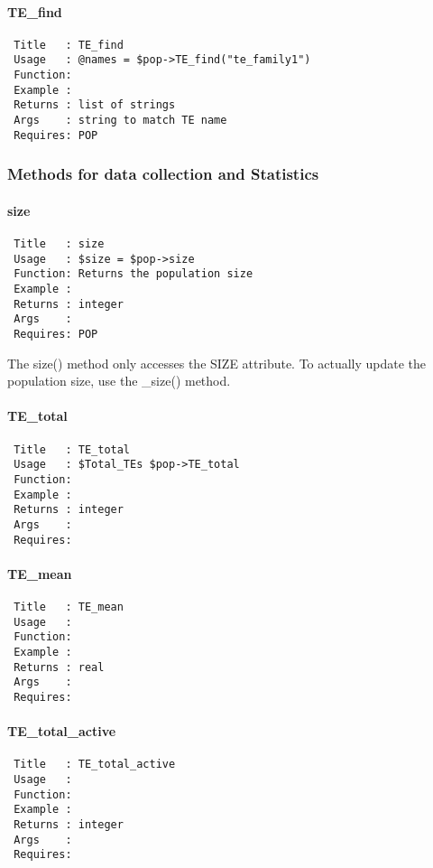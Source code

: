 \paragraph*{TE\_find\label{TE_find}}
\begin{verbatim}
 Title   : TE_find
 Usage   : @names = $pop->TE_find("te_family1")
 Function: 
 Example : 
 Returns : list of strings
 Args    : string to match TE name
 Requires: POP
\end{verbatim}
\subsubsection*{Methods for data collection and Statistics\label{Methods_for_data_collection_and_Statistics}}
\paragraph*{size\label{size}}
\begin{verbatim}
 Title   : size
 Usage   : $size = $pop->size
 Function: Returns the population size
 Example :
 Returns : integer
 Args    :
 Requires: POP
\end{verbatim}


The size() method only accesses the SIZE attribute. To actually update
the population size, use the \_size() method.

\paragraph*{TE\_total\label{TE_total}}
\begin{verbatim}
 Title   : TE_total
 Usage   : $Total_TEs $pop->TE_total
 Function: 
 Example : 
 Returns : integer
 Args    : 
 Requires:
\end{verbatim}
\paragraph*{TE\_mean\label{TE_mean}}
\begin{verbatim}
 Title   : TE_mean
 Usage   : 
 Function: 
 Example : 
 Returns : real
 Args    : 
 Requires:
\end{verbatim}
\paragraph*{TE\_total\_active\label{TE_total_active}}
\begin{verbatim}
 Title   : TE_total_active
 Usage   : 
 Function: 
 Example : 
 Returns : integer
 Args    : 
 Requires:
\end{verbatim}
